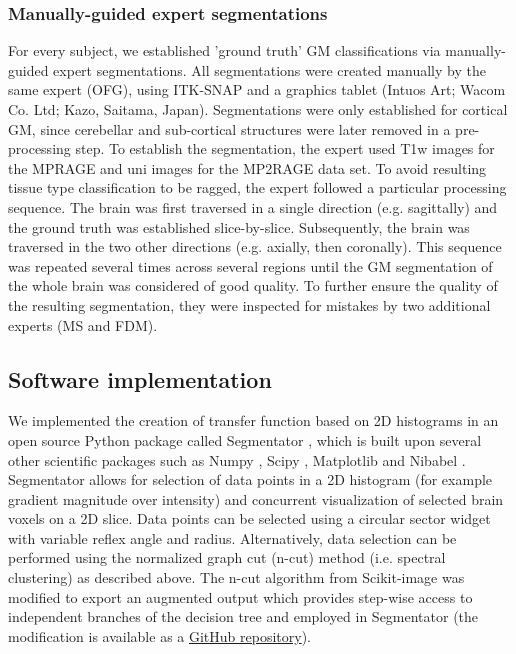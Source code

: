 \subsubsection{Manually-guided expert segmentations}
For every subject, we established 'ground truth' GM classifications via manually-guided expert segmentations. All segmentations were created manually by the same expert (OFG), using ITK-SNAP \parencite{py06nimg} and a graphics tablet (Intuos Art; Wacom Co. Ltd; Kazo, Saitama, Japan). Segmentations were only established for cortical GM, since cerebellar and sub-cortical structures were later removed in a pre-processing step. To establish the segmentation, the expert used T1w images for the MPRAGE and uni images for the MP2RAGE data set. To avoid resulting tissue type classification to be ragged, the expert followed a particular processing sequence. The brain was first traversed in a single direction (e.g. sagittally) and the ground truth was established slice-by-slice. Subsequently, the brain was traversed in the two other directions (e.g. axially, then coronally). This sequence was repeated several times across several regions until the GM segmentation of the whole brain was considered of good quality. To further ensure the quality of the resulting segmentation, they were inspected for mistakes by two additional experts (MS and FDM).

\subsection{Software implementation}
We implemented the creation of transfer function based on 2D histograms in an open source Python package called Segmentator \parencite*{segmentator_v1.5.0}, which is built upon several other scientific packages such as Numpy \parencite*{numpy2011}, Scipy \parencite*{scipy2001}, Matplotlib \parencite*{matplotlib2007} and Nibabel \parencite*{nibabel2017}. Segmentator allows for selection of data points in a 2D histogram (for example gradient magnitude over intensity) and concurrent visualization of selected brain voxels on a 2D slice. Data points can be selected using a circular sector widget with variable reflex angle and radius. Alternatively, data selection can be performed using the normalized graph cut (n-cut) method (i.e. spectral clustering) as described above. The n-cut algorithm from Scikit-image \parencite*{scikitimage2014} was modified to export an augmented output which provides step-wise access to independent branches of the decision tree and employed in Segmentator (the modification is available as a  \href{https://github.com/ofgulban/scikit-image/tree/ncut-rag-options}{GitHub repository}).

